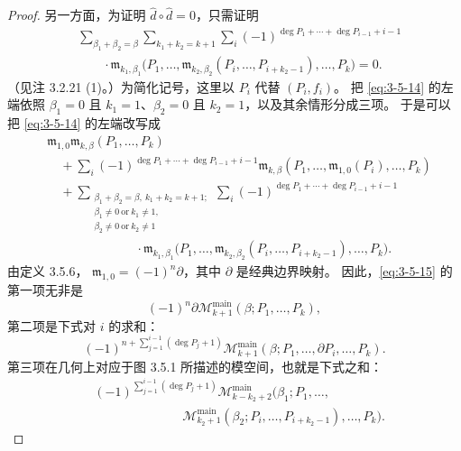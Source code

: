 \begin{proof}
另一方面，为证明 $\widehat d\circ\widehat d=0$，只需证明
\begin{equation}
\begin{aligned}
  &\sum_{\beta_1+\beta_2=\beta}
  \sum_{k_1+k_2=k+1}
  \sum_i
  (-1)^{\deg P_1+\cdots+\deg P_{i-1}+i-1}\\
  &\qquad{}\cdot
  \mathfrak m_{k_1,\beta_1}
  \bigl(P_1,\ldots,
  \mathfrak m_{k_2,\beta_2}
  (P_i,\ldots,P_{i+k_2-1}),\ldots,P_k\bigr)=0.
\end{aligned}
\tag{3.5.14}\label{eq:3-5-14}
\end{equation}
（见注 3.2.21 (1)。）为简化记号，这里以 $P_i$ 代替 $(P_i,f_i)$。
把 \eqref{eq:3-5-14} 的左端依照
$\beta_1=0$ 且 $k_1=1$、$\beta_2=0$ 且 $k_2=1$，以及其余情形分成三项。
于是可以把 \eqref{eq:3-5-14} 的左端改写成
\begin{equation}
\begin{aligned}
  &\mathfrak m_{1,0}\mathfrak m_{k,\beta}(P_1,\ldots,P_k)\\
  &\quad{}+\sum_i
  (-1)^{\deg P_1+\cdots+\deg P_{i-1}+i-1}
  \mathfrak m_{k,\beta}
  (P_1,\ldots,\mathfrak m_{1,0}(P_i),\ldots,P_k)\\
  &\quad{}+
  \sum_{\substack{
    \beta_1+\beta_2=\beta,\ k_1+k_2=k+1;\\
    \beta_1\ne0\ \mathrm{or}\ k_1\ne1,\\
    \beta_2\ne0\ \mathrm{or}\ k_2\ne1}}
  \sum_i
  (-1)^{\deg P_1+\cdots+\deg P_{i-1}+i-1}\\
  &\hspace{7em}{}\cdot
  \mathfrak m_{k_1,\beta_1}
  \bigl(P_1,\ldots,
  \mathfrak m_{k_2,\beta_2}
  (P_i,\ldots,P_{i+k_2-1}),\ldots,P_k\bigr).
\end{aligned}
\tag{3.5.15}\label{eq:3-5-15}
\end{equation}
由定义 3.5.6，
$\mathfrak m_{1,0}=(-1)^n\partial$，其中 $\partial$ 是经典边界映射。
因此，\eqref{eq:3-5-15} 的第一项无非是
\begin{equation}
  (-1)^n\partial
  \mathcal M_{k+1}^{\mathrm{main}}
  (\beta;P_1,\ldots,P_k),
  \tag{3.5.16.0}\label{eq:3-5-16-0}
\end{equation}
第二项是下式对 $i$ 的求和：
\begin{equation}
  (-1)^{n+\sum_{j=1}^{i-1}(\deg P_j+1)}
  \mathcal M_{k+1}^{\mathrm{main}}
  (\beta;P_1,\ldots,\partial P_i,\ldots,P_k).
  \tag{3.5.16.1}\label{eq:3-5-16-1}
\end{equation}
第三项在几何上对应于图 3.5.1 所描述的模空间，也就是下式之和：
\begin{equation}
\begin{aligned}
  &(-1)^{\sum_{j=1}^{i-1}(\deg P_j+1)}
  \mathcal M_{k-k_2+2}^{\mathrm{main}}
  \bigl(\beta_1;P_1,\ldots,\\
  &\hspace{7em}
  \mathcal M_{k_2+1}^{\mathrm{main}}
  (\beta_2;P_i,\ldots,P_{i+k_2-1}),\ldots,P_k\bigr).
\end{aligned}
\tag{3.5.16.2}\label{eq:3-5-16-2}
\end{equation}


\end{proof}
